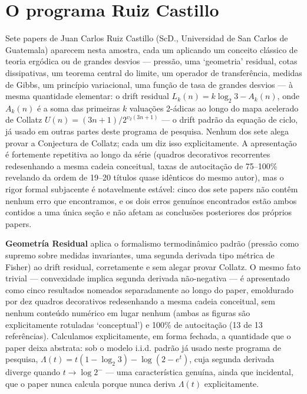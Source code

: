 \documentclass[11pt]{article}
\begin{document}
\section{O programa Ruiz Castillo}
\label{sec:rc}

Sete papers de Juan Carlos Ruiz Castillo (ScD., Universidad de San
Carlos de Guatemala) aparecem nesta amostra, cada um aplicando um
conceito clássico de teoria ergódica ou de grandes desvios --- pressão,
uma `geometria' residual, cotas dissipativas, um teorema central do
limite, um operador de transferência, medidas de Gibbs, um princípio
variacional, uma função de tasa de grandes desvios --- à mesma
quantidade elementar: o drift residual $L_k(n) = k\log_2 3 - A_k(n)$,
onde $A_k(n)$ é a soma das primeiras $k$ valuações 2-ádicas ao longo do
mapa acelerado de Collatz $U(n) = (3n+1)/2^{v_2(3n+1)}$ --- o drift
padrão da equação de ciclo, já usado em outras partes deste programa de
pesquisa. Nenhum dos sete alega provar a Conjectura de Collatz; cada um
diz isso explicitamente. A apresentação é fortemente repetitiva ao
longo da série (quadros decorativos recorrentes redesenhando a mesma
cadeia conceitual, taxas de autocitação de 75--100\% revelando da ordem
de 19--20 títulos quase idênticos do mesmo autor), mas o rigor formal
subjacente é notavelmente estável: cinco dos sete papers não contêm
nenhum erro que encontramos, e os dois erros genuínos encontrados estão
ambos contidos a uma única seção e não afetam as conclusões
posteriores dos próprios papers.

\textbf{Geometría Residual} \cite{RuizCastillo2026a} aplica o
formalismo termodinâmico padrão (pressão como supremo sobre medidas
invariantes, uma segunda derivada tipo métrica de Fisher) ao drift
residual, corretamente e sem alegar provar Collatz. O mesmo fato
trivial --- convexidade implica segunda derivada não-negativa --- é
apresentado como cinco resultados nomeados separadamente ao longo do
paper, emoldurado por dez quadros decorativos redesenhando a mesma
cadeia conceitual, sem nenhum conteúdo numérico em lugar nenhum (ambas
as figuras são explicitamente rotuladas `conceptual') e 100\% de
autocitação (13 de 13 referências). Calculamos explicitamente, em forma
fechada, a quantidade que o paper deixa abstrata: sob o modelo i.i.d.
padrão já usado neste programa de pesquisa, $\Lambda(t) = t(1-\log_2 3)
- \log(2-e^t)$, cuja segunda derivada diverge quando $t \to \log 2^-$
--- uma característica genuína, ainda que incidental, que o paper nunca
calcula porque nunca deriva $\Lambda(t)$ explicitamente.
\end{document}
